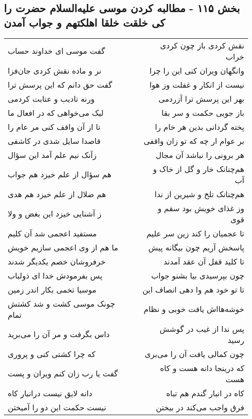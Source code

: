 \begin{center}
\section*{بخش ۱۱۵ - مطالبه کردن موسی علیه‌السلام حضرت را کی خلقت خلقا اهلکتهم و جواب آمدن}
\label{sec:sh115}
\begin{longtable}{l p{0.5cm} r}
گفت موسی ای خداوند حساب
&&
نقش کردی باز چون کردی خراب
\\
نر و ماده نقش کردی جان‌فزا
&&
وانگهان ویران کنی این را چرا
\\
گفت حق دانم که این پرسش ترا
&&
نیست از انکار و غفلت وز هوا
\\
ورنه تادیب و عتابت کردمی
&&
بهر این پرسش ترا آزردمی
\\
لیک می‌خواهی که در افعال ما
&&
باز جویی حکمت و سر بقا
\\
تا از آن واقف کنی مر عام را
&&
پخته گردانی بدین هر خام را
\\
قاصدا سایل شدی در کاشفی
&&
بر عوام ار چه که تو زان واقفی
\\
زآنک نیم علم آمد این سؤال
&&
هر برونی را نباشد آن مجال
\\
هم سؤال از علم خیزد هم جواب
&&
هم‌چنانک خار و گل از خاک و آب
\\
هم ضلال از علم خیزد هم هدی
&&
هم‌چنانک تلخ و شیرین از ندا
\\
ز آشنایی خیزد این بغض و ولا
&&
وز غذای خویش بود سقم و قوی
\\
مستفید اعجمی شد آن کلیم
&&
تا عجمیان را کند زین سر علیم
\\
ما هم از وی اعجمی سازیم خویش
&&
پاسخش آریم چون بیگانه پیش
\\
خرفروشان خصم یکدیگر شدند
&&
تا کلید قفل آن عقد آمدند
\\
پس بفرمودش خدا ای ذولباب
&&
چون بپرسیدی بیا بشنو جواب
\\
موسیا تخمی بکار اندر زمین
&&
تا تو خود هم وا دهی انصاف این
\\
چونک موسی کشت و شد کشتش تمام
&&
خوشه‌هااش یافت خوبی و نظام
\\
داس بگرفت و مر آن را می‌برید
&&
پس ندا از غیب در گوشش رسید
\\
که چرا کشتی کنی و پروری
&&
چون کمالی یافت آن را می‌بری
\\
گفت یا رب زان کنم ویران و پست
&&
که درینجا دانه هست و کاه هست
\\
دانه لایق نیست درانبار کاه
&&
کاه در انبار گندم هم تباه
\\
نیست حکمت این دو را آمیختن
&&
فرق واجب می‌کند در بیختن

\end{longtable}
\end{center}
